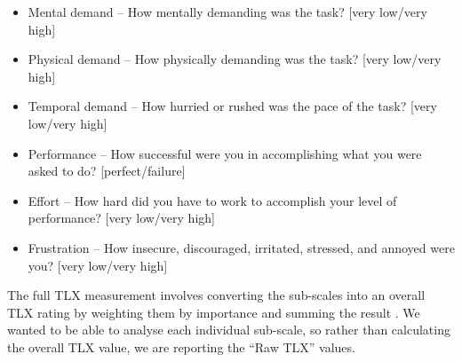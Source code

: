 
{\singlespacing
\begin{itemize}
  \item Mental demand -- How mentally demanding was the task? [very low/very high]
  \item Physical demand -- How physically demanding was the task? [very low/very high]
  \item Temporal demand -- How hurried or rushed was the pace of the task?  [very low/very high]
  \item Performance -- How successful were you in accomplishing what you were asked to do? [perfect/failure]
  \item Effort -- How hard did you have to work to accomplish your level of performance? [very low/very high]
  \item Frustration -- How insecure, discouraged, irritated, stressed, and annoyed were you? [very low/very high]
\end{itemize}
}

The full TLX measurement involves converting the sub-scales into an overall TLX rating by weighting them by importance
and summing the result \citep{Hart2006}. We wanted to be able to analyse each individual sub-scale, so rather than
calculating the overall TLX value, we are reporting the ``Raw TLX'' values.

